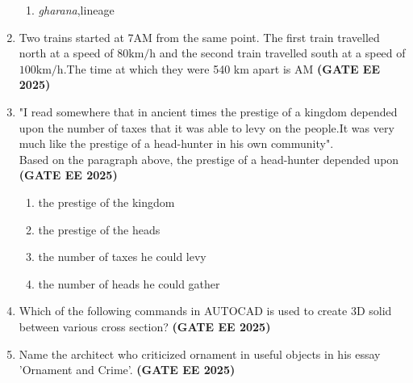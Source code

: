 \documentclass[journal,12pt,onecolumn]{IEEEtran}
\theoremstyle{remark}
\begin{document}
\begin{enumerate}
\begin{enumerate}
        \item \textit{gharana},lineage
\end{enumerate}
\item Two trains started at 7AM from the same point. The first train travelled north at a speed of $80 \text{km/h}$ and the second train travelled south at a speed of $100\text{km/h}$.The time at which they were 540 km apart is \underline{\makebox[1.5cm]{\hfill}}AM \hfill \textbf{(GATE EE 2025)}
\begin{enumerate}
\end{enumerate}
\item "I read somewhere that in ancient times the prestige of a kingdom depended upon the number of taxes that it was able to levy on the people.It was very much like the prestige of a head-hunter in his own community".\\
Based on the paragraph above, the prestige of a head-hunter depended upon \underline{\makebox[2cm]{\hfill}} \hfill \textbf{(GATE EE 2025)}
\begin{enumerate}
    \item the prestige of the kingdom
    \item the prestige of the heads
    \item the number of taxes he could levy
    \item the number of heads he could gather
\end{enumerate}
\item Which of the following commands in AUTOCAD is used to create 3D solid between various cross section? \hfill \textbf{(GATE EE 2025)}
\begin{enumerate}
\end{enumerate}
\item Name the architect who criticized ornament in useful objects in his essay 'Ornament and Crime'. \hfill \textbf{(GATE EE 2025)}

\end{enumerate}
\end{document}
